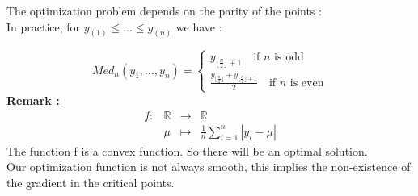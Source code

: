 \documentclass[unknownkeysallowed]{beamer}
\begin{document}

\begin{frame}
 The optimization problem depends on the parity of the points :\\
 In practice, for  $y_{(1)} \leqslant \dots \leqslant y_{(n)}$ we have :
 
 $$Med_{n}(y_{1}, \dots, y_{n}) =
\left\{
    \begin{array}{ll}
        y_{\lfloor\frac{n}{2}\rfloor+1} \quad \text{if $n$ is odd}\\
        \frac{y_{\lfloor\frac{n}{2}\rfloor}+y_{\lfloor\frac{n}{2}\rfloor+1}}{2} \quad \text{if $n$ is even}
    \end{array}
\right.
$$
\vspace{1cm}
\underline{\textbf{Remark :}}\\
$$\begin{array}{l|rcl}
    f : & \mathbb{R} & \longrightarrow & \mathbb{R} \\
    & \mu & \longmapsto &  \frac{1}{n} \sum_{i=1}^{n} |y_{i}-\mu|
\end{array}$$
The function f is a convex function. So there will be an optimal solution.\\
Our optimization function is not always smooth, this implies the non-existence of the gradient in the critical points.

\end{frame}



\end{document}
